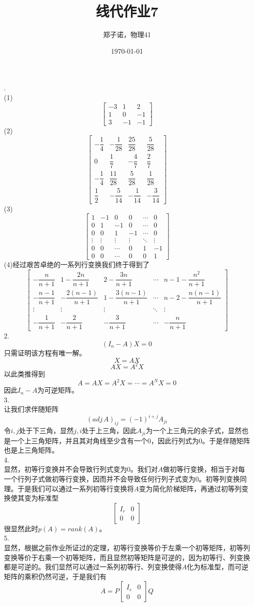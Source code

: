 \documentclass[utf8]{ctexart}
\title{线代作业7}
\author{郑子诺，物理41}
\date{\today}
\begin{document}
.\\
(1)\[
\begin{bmatrix}
	-3&1&2\\
	1&0&-1\\
	3&-1&-1
\end{bmatrix}\]
(2)\[\begin{bmatrix}
	-\dfrac{1}{4}&-\dfrac{1}{28}&\dfrac{25}{28}&\dfrac{5}{28}\\[8pt]
	0&\dfrac{1}{7}&-\dfrac{4}{7}&\dfrac{2}{7}\\[8pt]
	-\dfrac{1}{4}&\dfrac{11}{28}&\dfrac{5}{28}&\dfrac{1}{28}\\[8pt]
	\dfrac{1}{2}&-\dfrac{5}{14}&-\dfrac{1}{14}&-\dfrac{3}{14}
\end{bmatrix}\]
(3)\[\begin{bmatrix}
	1&-1&0&0&\cdots&0\\
	0&1&-1&0&\cdots&0\\
	0&0&1&-1&\cdots&0\\
	\vdots&\vdots&\vdots&\vdots&\ddots&\vdots\\
	0&0&\cdots&0&1&-1\\
	0&0&\cdots&0&0&1
\end{bmatrix}\]
(4)经过艰苦卓绝的一系列行变换我们终于得到了
\[\begin{bmatrix}
	-\dfrac{n}{n+1}&1-\dfrac{2n}{n+1}&2-\dfrac{3n}{n+1}&\cdots&n-1-\dfrac{n^2}{n+1}\\[8pt]
	-\dfrac{n-1}{n+1}&-\dfrac{2(n-1)}{n+1}&1-\dfrac{3(n-1)}{n+1}&\cdots&n-2-\dfrac{n(n-1)}{n+1}\\[8pt]
	\vdots&\vdots&\vdots&\ddots&\vdots\\[8pt]
	-\dfrac{1}{n+1}&-\dfrac{2}{n+1}&-\dfrac{3}{n+1}&\cdots&-\dfrac{n}{n+1}
\end{bmatrix}\]
2.\\
\[(I_n-A)X=0\]
只需证明该方程有唯一解。
\[X=AX\]
\[AX=A^2X\]
以此类推得到
\[A=AX=A^2X=\cdots=A^NX=0\]
因此$I_n-A$为可逆矩阵。\\
3.\\
让我们求伴随矩阵
\[(adj\,A)_{ij}=(-1)^{i+j}A_{ji}\]
令$i,j$处于下三角，显然$j,i$处于上三角，因此$A_{ji}$为一个上三角元的余子式，显然也是一个上三角矩阵，并且其对角线至少含有一个$0$，因此行列式为$0$。于是伴随矩阵也是上三角矩阵。\\
4.\\
显然，初等行变换并不会导致行列式变为$0$。我们对$A$做初等行变换，相当于对每一个行列子式做初等行变换，因而并不会导致任何行列子式变为$0$。初等列变换同理。于是我们可以通过一系列初等行变换将$A$变为简化阶梯矩阵，再通过初等列变换使其变为标准型
\[\begin{bmatrix}
	I_r&0\\
	0&0
\end{bmatrix}\]
很显然此时$p(A)=rank(A)$。\\
5.\\
显然，根据之前作业所证过的定理，初等行变换等价于左乘一个初等矩阵，初等列变换等价于右乘一个初等矩阵，而且显然初等矩阵是可逆的，因为初等行、列变换都是可逆的。我们显然可以通过一系列初等行、列变换使得$A$化为标准型，而可逆矩阵的乘积仍然可逆，于是我们有
\[A=P\begin{bmatrix}
	I_r&0\\
	0&0
\end{bmatrix}Q\]
\end{document}
